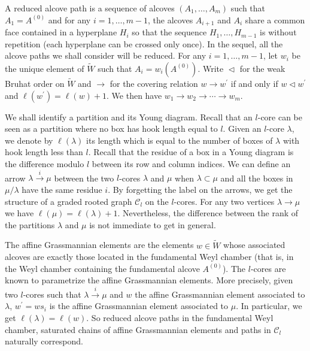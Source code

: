 \documentclass[ALCO,ThmDefs,Unicode,epreuves]{cedram}
\begin{document}
A reduced alcove path is a sequence of alcoves $(A_{1},\ldots,A_{m})$ such
that $A_{1}=A^{(0)}$ and for any $i=1,\ldots,m-1$, the alcoves $A_{i+1}$ and
$A_{i}$ share a common face contained in a hyperplane $H_{i}$ so that the
sequence $H_{1},\ldots,H_{m-1}$ is without repetition (each hyperplane can be
crossed only once). In the sequel, all the alcove paths we shall consider
will be reduced. For any $i=1,\ldots,m-1$, let $w_{i}$ be the unique element
of $\widetilde{W}$ such that $A_{i}=w_{i}(A^{(0)})$. Write $\vartriangleleft$
for the weak Bruhat order on $\widetilde{W}$ and $\rightarrow$ for the
covering relation $w\rightarrow w^{\prime}$ if and only if $w\vartriangleleft
w^{\prime}$ and $\ell(w^{\prime})=\ell(w)+1$. We then have $w_{1}\rightarrow
w_{2}\rightarrow\cdots\rightarrow w_{m}$.

We shall identify a partition and its Young diagram. Recall that an $l$-core
can be seen as a partition where no box has hook length equal to $l$. Given an
$l$-core $\lambda$, we denote by $\ell(\lambda)$ its length which is equal to
the number of boxes of $\lambda$ with hook length less than $l$. Recall that
the residue of a box in a Young diagram is the difference modulo $l$ between
its row and column indices. We can define an arrow $\lambda\overset
{i}{\rightarrow}\mu$ between the two $l$-cores $\lambda$ and $\mu$ when
$\lambda\subset\mu$ and all the boxes in $\mu/\lambda$ have the same residue
$i$. By forgetting the label on the arrows, we get the structure of a graded rooted
graph $\mathcal{C}_{l}$ on the $l$-cores. For any two vertices $\lambda
\rightarrow\mu$ we have $\ell(\mu)=\ell(\lambda)+1$. Nevertheless, the
difference between the rank of the partitions $\lambda$ and $\mu$ is not
immediate to get in general.

The affine Grassmannian elements are the elements $w\in\widetilde{W}$ whose
associated alcoves are exactly those located in the fundamental Weyl chamber
(that is, in the Weyl chamber containing the fundamental alcove $A^{(0)}%
$). The $l$-cores are known to parametrize the affine Grassmannian elements.
More precisely, given two $l$-cores such that $\lambda\overset{i}{\rightarrow
}\mu$ and $w$ the affine Grassmannian element associated to $\lambda$,
$w^{\prime}=ws_{i}$ is the affine Grassmannian element associated to $\mu
$. In particular, we get $\ell(\lambda)=\ell(w)$. So reduced alcove paths in
the fundamental Weyl chamber, saturated chains of affine Grassmannian elements
and paths in $\mathcal{C}_{l}$ naturally correspond.
\end{document}
